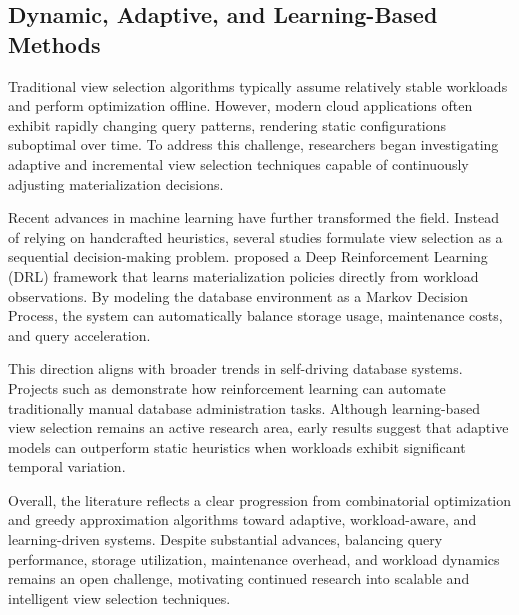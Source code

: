\subsection{Dynamic, Adaptive, and Learning-Based Methods}

Traditional view selection algorithms typically assume relatively stable workloads and perform optimization offline. However, modern cloud applications often exhibit rapidly changing query patterns, rendering static configurations suboptimal over time. To address this challenge, researchers began investigating adaptive and incremental view selection techniques capable of continuously adjusting materialization decisions.

Recent advances in machine learning have further transformed the field. Instead of relying on handcrafted heuristics, several studies formulate view selection as a sequential decision-making problem. \textcite{Yuan_2020} proposed a Deep Reinforcement Learning (DRL) framework that learns materialization policies directly from workload observations. By modeling the database environment as a Markov Decision Process, the system can automatically balance storage usage, maintenance costs, and query acceleration.

This direction aligns with broader trends in self-driving database systems. Projects such as \textcite{marcus2018deep} demonstrate how reinforcement learning can automate traditionally manual database administration tasks. Although learning-based view selection remains an active research area, early results suggest that adaptive models can outperform static heuristics when workloads exhibit significant temporal variation.

Overall, the literature reflects a clear progression from combinatorial optimization and greedy approximation algorithms toward adaptive, workload-aware, and learning-driven systems. Despite substantial advances, balancing query performance, storage utilization, maintenance overhead, and workload dynamics remains an open challenge, motivating continued research into scalable and intelligent view selection techniques.